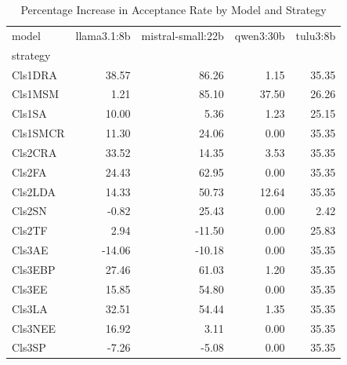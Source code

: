 \begin{table}
\caption{Percentage Increase in Acceptance Rate by Model and Strategy}
\label{tab:pct_increase}
\begin{tabular}{lrrrr}
\toprule
model & llama3.1:8b & mistral-small:22b & qwen3:30b & tulu3:8b \\
strategy &  &  &  &  \\
\midrule
Cls1DRA & 38.57 & 86.26 & 1.15 & 35.35 \\
Cls1MSM & 1.21 & 85.10 & 37.50 & 26.26 \\
Cls1SA & 10.00 & 5.36 & 1.23 & 25.15 \\
Cls1SMCR & 11.30 & 24.06 & 0.00 & 35.35 \\
Cls2CRA & 33.52 & 14.35 & 3.53 & 35.35 \\
Cls2FA & 24.43 & 62.95 & 0.00 & 35.35 \\
Cls2LDA & 14.33 & 50.73 & 12.64 & 35.35 \\
Cls2SN & -0.82 & 25.43 & 0.00 & 2.42 \\
Cls2TF & 2.94 & -11.50 & 0.00 & 25.83 \\
Cls3AE & -14.06 & -10.18 & 0.00 & 35.35 \\
Cls3EBP & 27.46 & 61.03 & 1.20 & 35.35 \\
Cls3EE & 15.85 & 54.80 & 0.00 & 35.35 \\
Cls3LA & 32.51 & 54.44 & 1.35 & 35.35 \\
Cls3NEE & 16.92 & 3.11 & 0.00 & 35.35 \\
Cls3SP & -7.26 & -5.08 & 0.00 & 35.35 \\
\bottomrule
\end{tabular}
\end{table}

